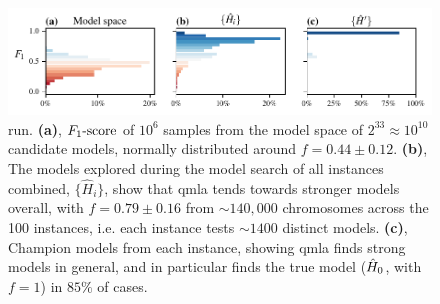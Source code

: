 \begin{figure}
    \begin{center}
        \includegraphics{experimental_study/figures/nv_ga_run_models_by_f.pdf}
    \end{center}
    \caption[  \gls{run}]{
          \gls{run}.
        \textbf{(a)}, 
            $ F_{1}\text{-score} $ of $10^6$ samples from the model space of $2^{33}\approx10^{10}$ candidate models,
            normally distributed around $f=0.44 \pm 0.12$. 
        \textbf{(b)}, The models explored during the model search of all instances combined, 
            $\{\hat{H}_i\}$, show that \gls{qmla} tends towards stronger models overall, 
            with $f = 0.79 \pm 0.16$ from $\sim 140,000$ chromosomes across the 100 instances, 
            i.e. each instance tests $\sim 1400$ distinct models. 
        \textbf{(c)}, Champion models from each instance, showing \gls{qmla} finds strong models 
            in general, and in particular finds the true model ($\hat{H}_0$, with $f=1$) in $85\%$ of cases.
        }
    \label{fig:nv_ga_run_models}
\end{figure}

